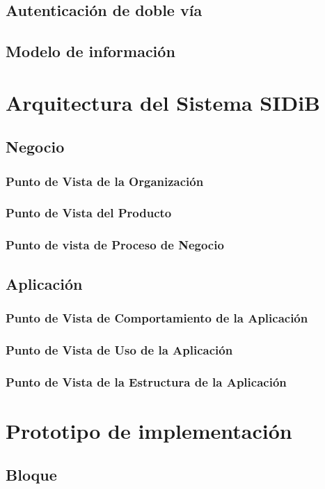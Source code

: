     \subsection{Autenticación de doble vía}
    \subsection{Modelo de información}
    \section{Arquitectura del Sistema SIDiB}
    \subsection{Negocio}
    \subsubsection{Punto de Vista de la Organización}
    \subsubsection{Punto de Vista del Producto}
    \subsubsection{Punto de vista de Proceso de Negocio}
    \subsection{Aplicación}
    \subsubsection{Punto de Vista de Comportamiento de la Aplicación}
    \subsubsection{Punto de Vista de Uso de la Aplicación}
    \subsubsection{Punto de Vista de la Estructura de la Aplicación}
    \section{Prototipo de implementación}
    \subsection{Bloque}

